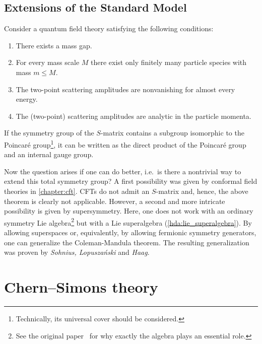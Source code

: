\subsection{Extensions of the Standard Model}

    \begin{theorem}
        Consider a quantum field theory satisfying the following conditions:
        \begin{enumerate}
            \item There exists a mass gap.
            \item For every mass scale $M$ there exist only finitely many particle species with mass $m\leq M$.
            \item The two-point scattering amplitudes are nonvanishing for almost every energy.
            \item The (two-point) scattering amplitudes are analytic in the particle momenta.
        \end{enumerate}
        If the symmetry group of the $S$-matrix contains a subgroup isomorphic to the Poincar\'e group\footnote{Technically, its universal cover should be considered.}, it can be written as the direct product of the Poincar\'e group and an internal gauge group.
    \end{theorem}

    Now the question arises if one can do better, i.e.~is there a nontrivial way to extend this total symmetry group? A first possibility was given by conformal field theories in \cref{chapter:cft}. CFTs do not admit an $S$-matrix and, hence, the above theorem is clearly not applicable. However, a second and more intricate possibility is given by supersymmetry. Here, one does not work with an ordinary symmetry Lie algebra\footnote{See the original paper~\citet{coleman_all_1967} for why exactly the algebra plays an essential role.} but with a Lie superalgebra (\cref{hda:lie_superalgebra}). By allowing superspaces or, equivalently, by allowing fermionic symmetry generators, one can generalize the Coleman-Mandula theorem. The resulting generalization was proven by \textit{Sohnius, Lopusza\'nski} and \textit{Haag}.

\section{Chern--Simons theory}

